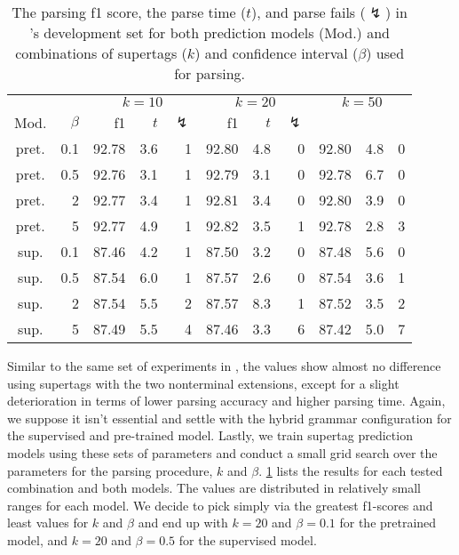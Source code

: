 \documentclass[../../document.tex]{subfiles}
\begin{document}
    \begin{table}
        \caption{\label{tbl:experiments:tiger:k}
        The parsing f1 score, the parse time ($t$), and parse fails ($\lightning$) in \tiger{}'s development set for both prediction models (Mod.) and combinations of supertags ($k$) and confidence interval ($\beta$) used for parsing.
        }
        \centering
        \setlength{\tabcolsep}{4pt}
        \vspace{.2cm}
        \begin{tabular}{cr|rrr|rrr|rrr}
            \toprule
&      &      \multicolumn{3}{c|}{$k = 10$} & \multicolumn{3}{c|}{$k = 20$} & \multicolumn{3}{c}{$k = 50$} \\
Mod. &  $\beta$  & f1 & $t$ & $\lightning$ & f1 & $t$ & $\lightning$ \\ \hline
pret. & 0.1  & 92.78 & 3.6 & 1 & 92.80 & 4.8 & 0 & 92.80 & 4.8 & 0 \\
pret. & 0.5  & 92.76 & 3.1 & 1 & 92.79 & 3.1 & 0 & 92.78 & 6.7 & 0 \\
pret. &   2  & 92.77 & 3.4 & 1 & 92.81 & 3.4 & 0 & 92.80 & 3.9 & 0 \\
pret. &   5  & 92.77 & 4.9 & 1 & 92.82 & 3.5 & 1 & 92.78 & 2.8 & 3 \\
\midrule
sup. & 0.1  & 87.46 & 4.2 & 1 & 87.50 & 3.2 & 0 & 87.48 & 5.6 & 0 \\
sup. & 0.5  & 87.54 & 6.0 & 1 & 87.57 & 2.6 & 0 & 87.54 & 3.6 & 1 \\
sup. &   2  & 87.54 & 5.5 & 2 & 87.57 & 8.3 & 1 & 87.52 & 3.5 & 2 \\
sup. &   5  & 87.49 & 5.5 & 4 & 87.46 & 3.3 & 6 & 87.42 & 5.0 & 7 \\
    \bottomrule
        \end{tabular}
    \end{table}

    Similar to the same set of experiments in , the values show almost no difference using  supertags with the two nonterminal extensions, except for a slight deterioration in terms of lower parsing accuracy and higher parsing time.
    Again, we suppose it isn't essential and settle with the hybrid grammar configuration for the supervised and pre-trained model.
    Lastly, we train supertag prediction models using these sets of parameters and conduct a small grid search over the parameters for the parsing procedure, $k$ and $\beta$.
    \cref{tbl:experiments:tiger:k} lists the results for each tested combination and both models.
    The values are distributed in relatively small ranges for each model.
    We decide to pick simply via the greatest f1-scores and least values for \(k\) and \(\beta\) and end up with \(k=20\) and \(\beta=0.1\) for the pretrained model, and \(k=20\) and \(\beta=0.5\) for the supervised model.
\end{document}
